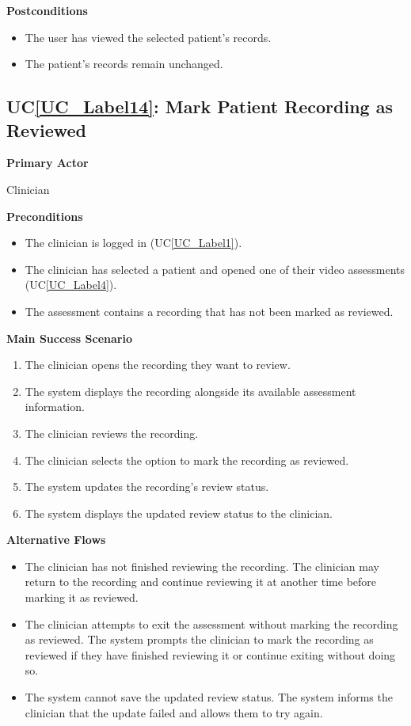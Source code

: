 \documentclass[12pt]{article}
\newcounter{ucnum} %
\newcommand{\ucref}[1]{UC\ref{#1}}
\begin{document}
\textbf{Postconditions}

\begin{itemize}
\item The user has viewed the selected patient's records.
\item The patient's records remain unchanged.
\end{itemize}

 \label{UC_Label14}

\subsection{\ucref{UC_Label14}: Mark Patient Recording as Reviewed}

\textbf{Primary Actor}

Clinician

\textbf{Preconditions}

\begin{itemize}
\item The clinician is logged in (\ucref{UC_Label1}).
\item The clinician has selected a patient and opened one of their video assessments (\ucref{UC_Label4}).
\item The assessment contains a recording that has not been marked as reviewed.
\end{itemize}

\textbf{Main Success Scenario}

\begin{enumerate}
\item The clinician opens the recording they want to review.
\item The system displays the recording alongside its available assessment information.
\item The clinician reviews the recording.
\item The clinician selects the option to mark the recording as reviewed.
\item The system updates the recording's review status.
\item The system displays the updated review status to the clinician.
\end{enumerate}

\textbf{Alternative Flows}

\begin{itemize}
\item[3a.] The clinician has not finished reviewing the recording. The clinician may return to the recording and continue reviewing it at another time before marking it as reviewed.
\item[4a.] The clinician attempts to exit the assessment without marking the recording as reviewed. The system prompts the clinician to mark the recording as reviewed if they have finished reviewing it or continue exiting without doing so.
\item[5a.] The system cannot save the updated review status. The system informs the clinician that the update failed and allows them to try again.
\end{itemize}
\end{document}
